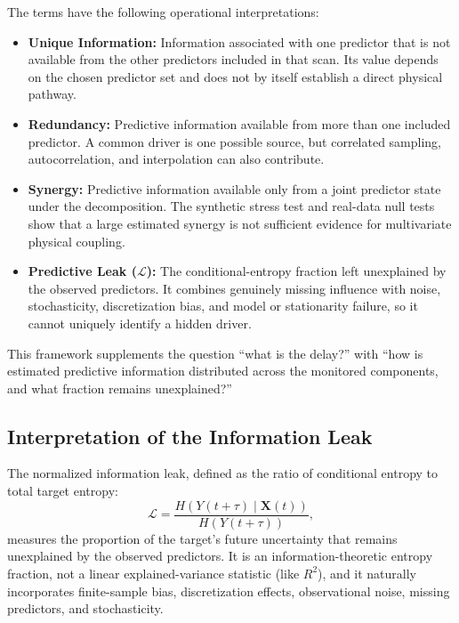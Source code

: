 \documentclass[fleqn,usenatbib]{mnras}
\begin{document}
The terms have the following operational interpretations:
\begin{itemize}
    \item \textbf{Unique Information:} Information associated with one predictor that is not available from the other predictors included in that scan. Its value depends on the chosen predictor set and does not by itself establish a direct physical pathway.
    \item \textbf{Redundancy:} Predictive information available from more than one included predictor. A common driver is one possible source, but correlated sampling, autocorrelation, and interpolation can also contribute.
    \item \textbf{Synergy:} Predictive information available only from a joint predictor state under the decomposition. The synthetic stress test and real-data null tests show that a large estimated synergy is not sufficient evidence for multivariate physical coupling.
    \item \textbf{Predictive Leak ($\mathcal{L}$):} The conditional-entropy fraction left unexplained by the observed predictors. It combines genuinely missing influence with noise, stochasticity, discretization bias, and model or stationarity failure, so it cannot uniquely identify a hidden driver.
\end{itemize}
This framework supplements the question ``what is the delay?'' with ``how is estimated predictive information distributed across the monitored components, and what fraction remains unexplained?''

\subsection{Interpretation of the Information Leak}

The normalized information leak, defined as the ratio of conditional entropy to total target entropy:
\begin{equation}
\mathcal{L} = \frac{H(Y(t+\tau) \mid \mathbf{X}(t))}{H(Y(t+\tau))},
\end{equation}
measures the proportion of the target's future uncertainty that remains unexplained by the observed predictors. It is an information-theoretic entropy fraction, not a linear explained-variance statistic (like $R^2$), and it naturally incorporates finite-sample bias, discretization effects, observational noise, missing predictors, and stochasticity.
\end{document}
